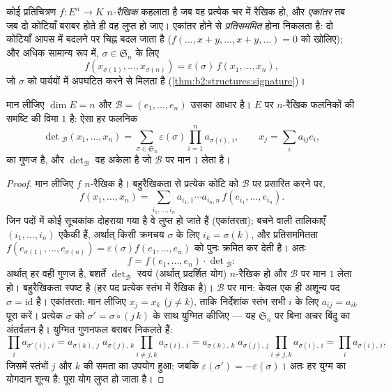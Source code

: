 \begin{definition}\label{def:b2:linalg:alternating}
कोई प्रतिचित्रण $f \colon E^n \to K$ \emph{$n$-रैखिक} कहलाता है जब वह प्रत्येक चर में
रैखिक हो, और \emph{एकांतर} तब जब दो कोटियाँ बराबर
होते ही वह लुप्त हो जाए। एकांतर होने से \emph{प्रतिसममित} होना निकलता
है: दो कोटियाँ आपस में बदलने पर चिह्न बदल जाता है ($f(\dots, x + y, \dots, x + y, \dots) = 0$ को खोलिए); और
अधिक सामान्य रूप में, $\sigma \in \mathfrak{S}_n$ के लिए
\[
f(x_{\sigma(1)}, \dots, x_{\sigma(n)}) =
\varepsilon(\sigma)\, f(x_1, \dots, x_n),
\]
जो $\sigma$ को पार्ययों में अपघटित करने से मिलता है (\cref{thm:b2:structures:signature})।
\end{definition}

\begin{theorem}[सारणिकों की मूल प्रमेय]\label{thm:b2:linalg:detspace}
मान लीजिए $\dim E = n$ और $\mathcal{B} = (e_1, \dots, e_n)$ उसका आधार है। $E$ पर  $n$-रैखिक फलनिकों की
समष्टि की विमा $1$ है: ऐसा हर फलनिक
\[
\det{}_{\mathcal{B}}(x_1, \dots, x_n)
= \sum_{\sigma \in \mathfrak{S}_n} \varepsilon(\sigma)
\prod_{i=1}^{n} a_{\sigma(i),\,i},
\qquad
x_j = \sum_{i} a_{ij} e_i ,
\]
का गुणज है, और $\det_{\mathcal{B}}$ वह अकेला है जो $\mathcal{B}$ पर मान $1$ लेता
है।
\end{theorem}

\begin{proof}
मान लीजिए $f$  $n$-रैखिक है। बहुरैखिकता से प्रत्येक कोटि को $\mathcal{B}$
पर प्रसारित करने पर,
\[
f(x_1, \dots, x_n)
= \sum_{i_1, \dots, i_n} a_{i_1,1}\cdots a_{i_n,n}\,
f(e_{i_1}, \dots, e_{i_n}).
\]
जिन पदों में कोई सूचकांक दोहराया गया है वे लुप्त हो जाते हैं
(एकांतरता); बचने वाली तालिकाएँ $(i_1, \dots, i_n)$ एकैकी हैं, अर्थात् किसी क्रमचय $\sigma$
के लिए $i_k =
\sigma(k)$, और प्रतिसममितता $f(e_{\sigma(1)}, \dots, e_{\sigma(n)}) = \varepsilon(\sigma)
f(e_1, \dots, e_n)$ को पुनः क्रमित कर देती है। अतः
\[
f = f(e_1, \dots, e_n) \cdot \det{}_{\mathcal{B}} :
\]
अर्थात् हर  वही गुणज है, बशर्ते $\det_{\mathcal{B}}$ स्वयं (अर्थात्
प्रदर्शित योग)  $n$-रैखिक हो और $\mathcal B$ पर मान $1$ लेता हो।
बहुरैखिकता स्पष्ट है (हर पद प्रत्येक स्तंभ में रैखिक है)। $\mathcal B$ पर मान:
केवल एक ही अशून्य पद $\sigma =
\mathrm{id}$ है। एकांतरता: मान लीजिए $x_j = x_k$ ($j \neq k$), ताकि
निर्देशांक स्तंभ सभी $i$ के लिए $a_{i j} = a_{i k}$ पूरा करें। प्रत्येक $\sigma$ को $\sigma' = \sigma\circ(j\,k)$
के साथ युग्मित कीजिए --- यह $\mathfrak{S}_n$ पर बिना अचर बिंदु का अंतर्वलन है।
युग्मित गुणनफल बराबर निकलते हैं:
\[
\prod_i a_{\sigma'(i),\,i}
= a_{\sigma(k),\,j}\; a_{\sigma(j),\,k}
\prod_{i \neq j,k} a_{\sigma(i),\,i}
= a_{\sigma(k),\,k}\; a_{\sigma(j),\,j}
\prod_{i \neq j,k} a_{\sigma(i),\,i}
= \prod_i a_{\sigma(i),\,i},
\]
जिसमें स्तंभों $j$ और $k$ की समता का उपयोग हुआ; जबकि $\varepsilon(\sigma') = -\varepsilon(\sigma)$। अतः हर
युग्म का योगदान शून्य है: पूरा योग लुप्त हो जाता है।
\end{proof}

